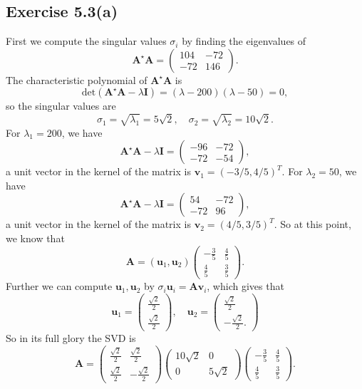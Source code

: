 \documentclass{article}
\begin{document}
\subsection{Exercise 5.3(a)}
First we compute the singular values $\sigma_i$ by finding the eigenvalues of
$$
\bm{A}^{\star} \bm{A} = \begin{pmatrix}
104 & -72 \\
-72 & 146
\end{pmatrix}.
$$
The characteristic polynomial of $\bm{A}^\star \bm{A}$ is
$$
\mathrm{det} (\bm{A}^{\star} \bm{A} - \lambda \bm{I}) = (\lambda - 200) (\lambda - 50) = 0,
$$
so the singular values are
$$
\sigma_1 = \sqrt{\lambda_1} = 5 \sqrt{2}, \quad \sigma_2 = \sqrt{\lambda_2} = 10 \sqrt{2}.
$$
For $\lambda_1 = 200$, we have
$$
\bm{A}^\star \bm{A} - \lambda \bm{I} = \begin{pmatrix}
    -96 & -72 \\
    -72 & -54
\end{pmatrix},
$$
a unit vector in the kernel of the matrix is $\bm{v}_1 = (-3/5, 4/5)^T$.
For $\lambda_2 = 50$, we have
$$
\bm{A}^\star \bm{A} - \lambda \bm{I} = \begin{pmatrix}
    54 & -72 \\
    -72 & 96
\end{pmatrix},
$$
a unit vector in the kernel of the matrix is $\bm{v}_2 = (4/5, 3/5)^T$. So at this point, we know that
$$
\bm{A}= (\bm{u}_1, \bm{u}_2) \begin{pmatrix}
    -\frac{3}{5} & \frac{4}{5}\\
    \frac{4}{5} & \frac{3}{5}
\end{pmatrix}.
$$
Further we can compute $\bm{u}_1, \bm{u}_2$ by $\sigma_i \bm{u}_i = \bm{A} \bm{v}_i$, which gives that
$$
\bm{u}_1 = \begin{pmatrix}
    \frac{\sqrt{2}}{2}\\
    \frac{\sqrt{2}}{2}
\end{pmatrix},\quad \bm{u}_2 = \begin{pmatrix}
    \frac{\sqrt{2}}{2}\\
    -\frac{\sqrt{2}}{2}.
\end{pmatrix}
$$
So in its full glory the SVD is 
$$
\bm{A} = \begin{pmatrix}
    \frac{\sqrt{2}}{2}& \frac{\sqrt{2}}{2} \\
    \frac{\sqrt{2}}{2} &-\frac{\sqrt{2}}{2}
\end{pmatrix} \begin{pmatrix}
    10\sqrt{2} & 0 \\
    0 & 5\sqrt{2}
\end{pmatrix} \begin{pmatrix}
    -\frac{3}{5} & \frac{4}{5} \\
    \frac{4}{5} & \frac{3}{5}
\end{pmatrix}.
$$
\end{document}
